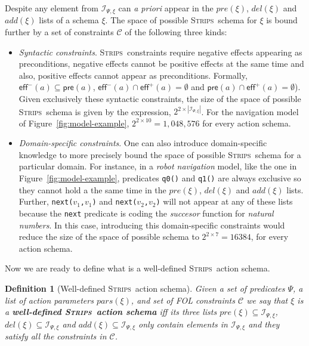 \documentclass[letterpaper]{article} %
\newcommand{\pre}{\mathsf{pre}}     %
\newcommand{\eff}{\mathsf{eff}}     %
\newcommand{\strips}{\textsc{Strips}}     %
\newtheorem{definition}[theorem]{Definition}
\begin{document}
Despite any element from ${\mathcal I}_{\Psi,\xi}$ can {\em a priori} appear in the $pre(\xi)$, $del(\xi)$ and $add(\xi)$ lists of a schema $\xi$. The space of possible \strips\ schema for $\xi$ is bound further by a set of constraints ${\mathcal C}$ of the following three kinds: 
\begin{itemize}
\item {\em Syntactic constraints}. \strips\ constraints require negative effects appearing as preconditions, negative effects cannot be positive effects at the same time and also, positive effects cannot appear as preconditions. Formally, $\eff^-(a)\subseteq \pre(a)$, $\eff^-(a)\cap \eff^+(a)=\emptyset$ and $\pre(a)\cap \eff^+(a)=\emptyset$). Given exclusively these syntactic constraints, the size of the space of possible \strips\ schema is given by the expression, $2^{2\times|{\mathcal I}_{\Psi,\xi}|}$. For the navigation model of Figure~\ref{fig:model-example}, $2^{2\times 10}=1,048,576$ for every action schema.
\item {\em Domain-specific constraints}. One can also introduce domain-specific knowledge to more precisely bound the space of possible \strips\ schema for a particular domain. For instance, in a {\em robot navigation} model, like the one in Figure~\ref{fig:model-example}, predicates {\small\tt q0()} and {\small\tt q1()} are always exclusive so they cannot hold a the same time in the $pre(\xi)$, $del(\xi)$ and $add(\xi)$ lists. Further, {\small\tt next($v_1$,$v_1$)} and {\small\tt next($v_2$,$v_2$)} will not appear at any of these lists because the {\tt\small next} predicate is coding the {\em succesor} function for {\em natural numbers}. In this case, introducing this domain-specific constraints would reduce the size of the space of possible schema to $2^{2\times 7}=16384$, for every action schema.
\end{itemize}

Now we are ready to define what is a well-defined \strips\ action schema.
\begin{definition}[Well-defined \strips\ action schema]
Given a set of {\em predicates} $\Psi$, a list of action {\em parameters} $pars(\xi)$, and set of FOL constraints ${\mathcal C}$ we say that $\xi$ is a {\bf well-defined \strips\ action schema} iff its three lists $pre(\xi)\subseteq {\mathcal I}_{\Psi,\xi}$, $del(\xi)\subseteq{\mathcal I}_{\Psi,\xi}$ and $add(\xi)\subseteq{\mathcal I}_{\Psi,\xi}$ only contain elements in ${\mathcal I}_{\Psi,\xi}$ and they satisfy all the constraints in ${\mathcal C}$. 
\end{definition}
\end{document}
